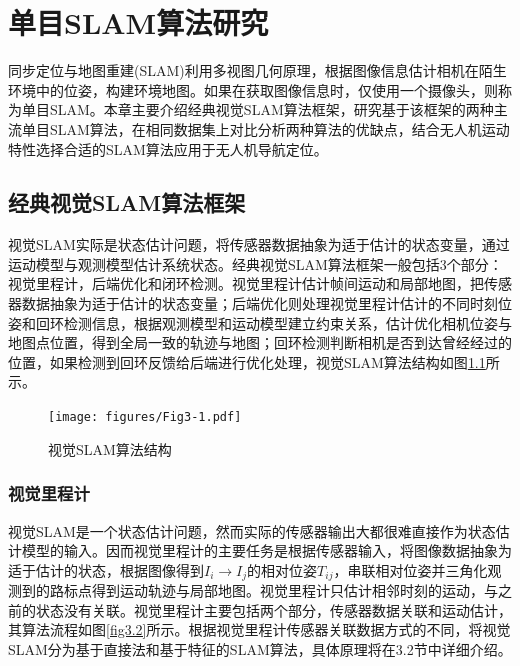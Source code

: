 
\chapter{单目SLAM算法研究}
\label{chap:ALGORITHM}

同步定位与地图重建(SLAM)利用多视图几何原理\upcite{[1.1]}，根据图像信息估计相机在陌生环境中的位姿，构建环境地图。如果在获取图像信息时，仅使用一个摄像头，则称为单目SLAM。本章主要介绍经典视觉SLAM算法框架，研究基于该框架的两种主流单目SLAM算法，在相同数据集上对比分析两种算法的优缺点，结合无人机运动特性选择合适的SLAM算法应用于无人机导航定位。

\section{经典视觉SLAM算法框架}
视觉SLAM实际是状态估计问题，将传感器数据抽象为适于估计的状态变量，通过运动模型与观测模型估计系统状态。经典视觉SLAM算法框架\upcite{[3.1]}一般包括3个部分：视觉里程计，后端优化和闭环检测。视觉里程计估计帧间运动和局部地图，把传感器数据抽象为适于估计的状态变量；后端优化则处理视觉里程计估计的不同时刻位姿和回环检测信息，根据观测模型和运动模型建立约束关系，估计优化相机位姿与地图点位置，得到全局一致的轨迹与地图；回环检测判断相机是否到达曾经经过的位置，如果检测到回环反馈给后端进行优化处理，视觉SLAM算法结构如图\ref{fig3.1}所示。

\begin{figure}[h]
\centering
\texttt{[image: figures/Fig3-1.pdf]}
\caption{视觉SLAM算法结构}
\label{fig3.1}
\end{figure}

\subsection{视觉里程计}
视觉SLAM是一个状态估计问题，然而实际的传感器输出大都很难直接作为状态估计模型的输入。因而视觉里程计的主要任务是根据传感器输入，将图像数据抽象为适于估计的状态，根据图像得到$I_i \rightarrow I_j$的相对位姿$T_{ij}$，串联相对位姿并三角化观测到的路标点得到运动轨迹与局部地图。视觉里程计只估计相邻时刻的运动，与之前的状态没有关联。视觉里程计主要包括两个部分，传感器数据关联和运动估计\upcite{[1.39]}，其算法流程如图\ref{fig3.2}所示。根据视觉里程计传感器关联数据方式的不同，将视觉SLAM分为基于直接法和基于特征的SLAM算法，具体原理将在3.2节中详细介绍。

